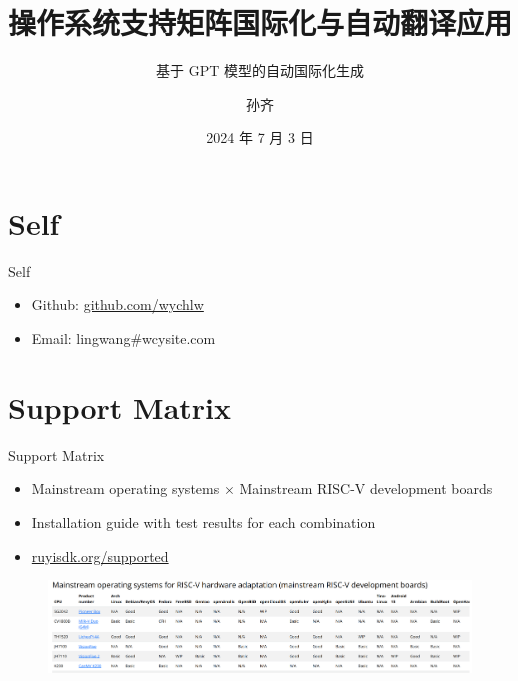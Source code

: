 \documentclass{beamer}
\title{操作系统支持矩阵国际化与自动翻译应用}
\subtitle{基于 GPT 模型的自动国际化生成}
\institute{测试小队}
\author{孙齐}
\date{2024 年 7 月 3 日}
\begin{document}
\begin{frame}
    \titlepage
\end{frame}

\begin{frame}
    \tableofcontents[sectionstyle=show,subsectionstyle=show/shaded/hide,subsubsectionstyle=show/shaded/hide]
\end{frame}

\section{Self}

\begin{frame}{Self}
    \begin{itemize}
        \item Github: \href{\#wychlw}{github.com/wychlw}
        \newline
        \item Email: lingwang\#wcysite.com
        \newline
    \end{itemize}
\end{frame}

\section{Support Matrix}

\begin{frame}{Support Matrix}
    \begin{itemize}
        \item Mainstream operating systems $\times$ Mainstream RISC-V development boards
        \item Installation guide with test results for each combination
        \item \url{ruyisdk.org/supported}
    \end{itemize}
    \begin{figure}
        \centering
            \includegraphics[width=\textwidth]{pic/matrix.png}
    \end{figure}
\end{frame}
\end{document}
